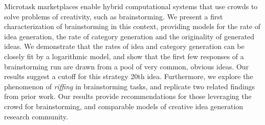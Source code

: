 Microtask marketplaces enable hybrid computational systems that use crowds to solve problems of creativity, such as brainstorming. We present a first characterization of brainstorming in this context, providing models for the rate of idea generation, the rate of category generation and the originality of generated ideas. We demonstrate that the rates of idea and category generation can be closely fit by a logarithmic model, and show that the first few responses of a brainstorming run are drawn from a pool of very common, obvious ideas. Our results suggest a cutoff for this strategy 20th idea. Furthermore, we explore the phenomenon of \emph{riffing} in brainstorming tasks, and replicate two related findings from prior work. Our results provide recommendations for those leveraging the crowd for brainstorming, and comparable models of creative idea generation research community.


